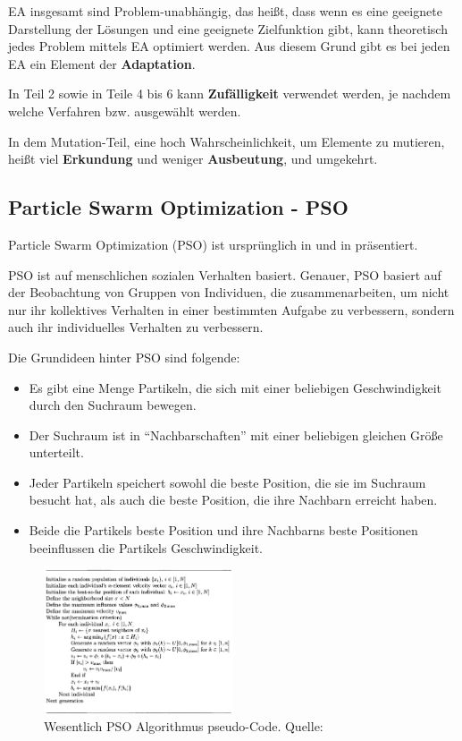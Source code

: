 \documentclass[twoside,twocolumn]{article}
\begin{document}
EA insgesamt sind Problem-unabhängig, das heißt, dass wenn es eine geeignete Darstellung der Lösungen und eine geeignete Zielfunktion gibt, kann theoretisch jedes Problem mittels EA optimiert werden. Aus diesem Grund gibt es bei jeden EA ein Element der \textbf{Adaptation}.\par
In Teil 2 sowie in Teile 4 bis 6 kann \textbf{Zufälligkeit} verwendet werden, je nachdem welche Verfahren bzw. ausgewählt werden.\par
In dem Mutation-Teil, eine hoch Wahrscheinlichkeit, um Elemente zu mutieren, heißt viel \textbf{Erkundung} und weniger \textbf{Ausbeutung}, und umgekehrt.

\subsection{Particle Swarm Optimization - PSO}
Particle Swarm Optimization (PSO) ist ursprünglich in \cite{kennedy_pso} und in \cite{shi_pso} präsentiert.\par
PSO ist auf menschlichen sozialen Verhalten basiert. \cite{eberhart_pso} Genauer,  PSO basiert auf der Beobachtung von Gruppen von Individuen, die zusammenarbeiten, um nicht nur ihr kollektives Verhalten in einer bestimmten Aufgabe zu verbessern, sondern auch ihr individuelles Verhalten zu verbessern.\par
Die Grundideen hinter PSO sind folgende:

\begin{itemize}
\item Es gibt eine Menge Partikeln, die sich mit einer beliebigen Geschwindigkeit durch den Suchraum bewegen.
\item Der Suchraum ist in \enquote{Nachbarschaften} mit einer beliebigen gleichen Größe unterteilt.
\item Jeder Partikeln speichert sowohl die beste Position, die sie im Suchraum besucht hat, als auch die beste Position, die ihre Nachbarn erreicht haben.
\item Beide die Partikels beste Position und ihre Nachbarns beste Positionen beeinflussen die Partikels Geschwindigkeit.
\end{itemize}

\begin{figure}[h]
\caption{Wesentlich PSO Algorithmus pseudo-Code. Quelle: \cite{wiley_evolutionary}}
\label{fig:pso_pseudo}
\centering
\includegraphics[width=0.5\textwidth]{images/pso_pseudo.png}
\end{figure}
\end{document}
